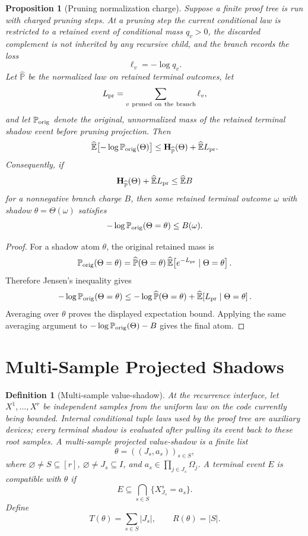 \documentclass[11pt]{article}
\newtheorem{proposition}[theorem]{Proposition}
\newtheorem{definition}[theorem]{Definition}
\newcommand{\Prb}{\mathbb P}
\newcommand{\EE}{\mathbb E}
\newcommand{\bfH}{\mathbf H}
\begin{document}
\begin{proposition}[Pruning normalization charge]
\label{prop:pruning-normalization}
Suppose a finite proof tree is run with charged pruning steps.  At a pruning
step the current conditional law is restricted to a retained event of conditional
mass $q_v>0$, the discarded complement is not inherited by any recursive child,
and the branch records the loss
\[
  \ell_v=-\log q_v .
\]
Let $\widehat{\Prb}$ be the normalized law on retained terminal outcomes, let
\[
  L_{\rm pr}=\sum_{v\ {\rm pruned\ on\ the\ branch}}\ell_v,
\]
and let $\Prb_{\rm orig}$ denote the original, unnormalized mass of the retained
terminal shadow event before pruning projection.  Then
\[
  \widehat{\EE}\bigl[-\log \Prb_{\rm orig}(\Theta)\bigr]
  \le
  \bfH_{\widehat{\Prb}}(\Theta)+\widehat{\EE}L_{\rm pr}.
\]
Consequently, if
\[
  \bfH_{\widehat{\Prb}}(\Theta)+\widehat{\EE}L_{\rm pr}
  \le
  \widehat{\EE} B
\]
for a nonnegative branch charge $B$, then some retained terminal outcome
$\omega$ with shadow $\theta=\Theta(\omega)$ satisfies
\[
  -\log \Prb_{\rm orig}(\Theta=\theta)\le B(\omega).
\]
\end{proposition}

\begin{proof}
For a shadow atom $\theta$, the original retained mass is
\[
  \Prb_{\rm orig}(\Theta=\theta)
  =
  \widehat{\Prb}(\Theta=\theta)\,
  \widehat{\EE}\!\left[e^{-L_{\rm pr}}\mid \Theta=\theta\right].
\]
Therefore Jensen's inequality gives
\[
  -\log \Prb_{\rm orig}(\Theta=\theta)
  \le
  -\log \widehat{\Prb}(\Theta=\theta)
  +
  \widehat{\EE}\!\left[L_{\rm pr}\mid \Theta=\theta\right].
\]
Averaging over $\theta$ proves the displayed expectation bound.  Applying the
same averaging argument to
$-\log\Prb_{\rm orig}(\Theta)-B$ gives the final atom.
\end{proof}

\section{Multi-Sample Projected Shadows}

\begin{definition}[Multi-sample value-shadow]
\label{def:multi-sample-shadow}
At the recurrence interface, let $X^1,\ldots,X^r$ be independent samples from
the uniform law on the code currently being bounded.  Internal conditional
tuple laws used by the proof tree are auxiliary devices; every terminal shadow
is evaluated after pulling its event back to these root samples.  A
multi-sample projected value-shadow is a finite list
\[
  \theta=((J_s,a_s))_{s\in S},
\]
where $\varnothing\ne S\subseteq [r]$, $\varnothing\ne J_s\subseteq I$, and
$a_s\in\prod_{j\in J_s}\Omega_j$.  A terminal event $E$ is compatible with
$\theta$ if
\[
  E \subseteq \bigcap_{s\in S}\{X^s_{J_s}=a_s\}.
\]
Define
\[
  T(\theta)=\sum_{s\in S}|J_s|,\qquad R(\theta)=|S|.
\]
\end{definition}
\end{document}
